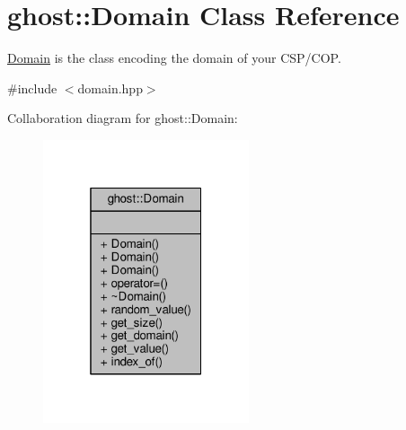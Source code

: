 \hypertarget{classghost_1_1Domain}{}\section{ghost\+:\+:Domain Class Reference}
\label{classghost_1_1Domain}


\hyperlink{classghost_1_1Domain}{Domain} is the class encoding the domain of your C\+S\+P/\+C\+OP.  




{\ttfamily \#include $<$domain.\+hpp$>$}



Collaboration diagram for ghost\+:\+:Domain\+:
\nopagebreak
\begin{figure}[H]
\begin{center}
\leavevmode
\includegraphics[width=172pt]{classghost_1_1Domain__coll__graph}
\end{center}
\end{figure}
